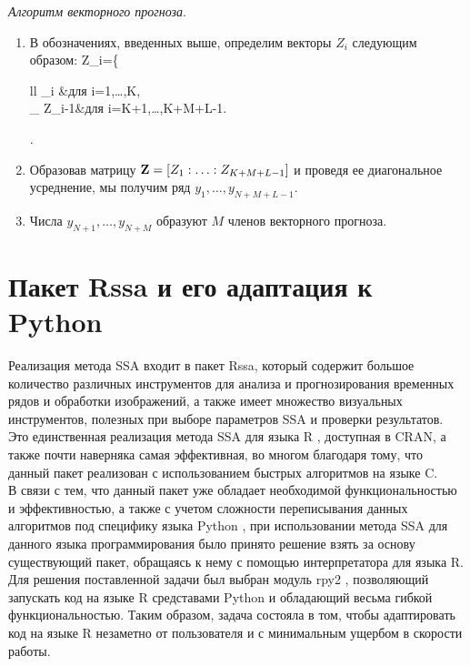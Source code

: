 \documentclass[specialist,
			   substylefile = spbu_report.rtx,
			   subf,href,colorlinks=true, 12pt]{disser}
\begin{document}
\emph{Алгоритм векторного прогноза}.
\begin{enumerate}
	\item
	В обозначениях, введенных выше, определим векторы $Z_i$ следующим образом:
	\be
	\label{eq:V_FOR} Z_i=\left\{
	\begin{array}{ll}
		_i &{\rm для \;} \; i=1,\ldots,K,\\
		\cP_{} Z_{i-1}&{\rm для \;} \; i=K+1,\ldots,K+M+L-1.\\
	\end{array}
	\right.
	\ee
	\item
	Образовав матрицу $\mathbf{Z}=[Z_1:\ldots:Z_{K+M+L-1}]$ и проведя ее диагональное усреднение, мы получим ряд $y_1,\ldots,y_{N+M+L-1}$.
	\item
	Числа $y_{N+1},\ldots,y_{N+M}$ образуют $M$ членов векторного прогноза.
	
\end{enumerate}

\chapter{Пакет Rssa и его адаптация к Python}

Реализация метода SSA входит в пакет Rssa, который содержит большое количество различных инструментов для анализа и прогнозирования временных рядов и обработки изображений, а также имеет множество визуальных инструментов, полезных при выборе параметров SSA и проверки результатов. Это единственная реализация метода SSA для языка R \cite{r-doc}, доступная в CRAN, а также почти наверняка самая эффективная, во многом благодаря тому, что данный пакет реализован с использованием быстрых алгоритмов на языке C.\\

В связи с тем, что данный пакет уже обладает необходимой функциональностью и эффективностью, а также с учетом сложности переписывания данных алгоритмов под специфику языка Python \cite{py-doc}, при использовании метода SSA для данного языка программирования было принято решение взять за основу существующий пакет, обращаясь к нему с помощью интерпретатора для языка R. Для решения поставленной задачи был выбран модуль rpy2 \cite{rpy-doc}, позволяющий запускать код на языке R средставами Python и обладающий весьма гибкой функциональностью. Таким образом, задача состояла в том, чтобы адаптировать код на языке R незаметно от пользователя и с минимальным ущербом в скорости работы.\\
\end{document}
